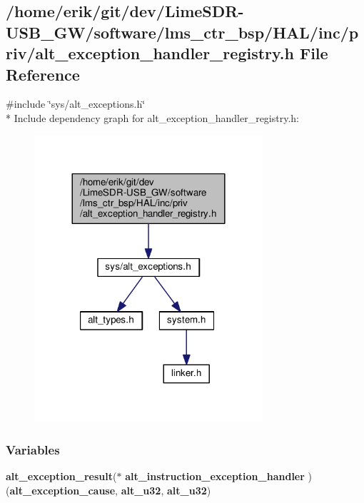 \subsection{/home/erik/git/dev/\+Lime\+S\+D\+R-\/\+U\+S\+B\+\_\+\+G\+W/software/lms\+\_\+ctr\+\_\+bsp/\+H\+A\+L/inc/priv/alt\+\_\+exception\+\_\+handler\+\_\+registry.h File Reference}
\label{alt__exception__handler__registry_8h}
{\ttfamily \#include \char`\"{}sys/alt\+\_\+exceptions.\+h\char`\"{}}\\*
Include dependency graph for alt\+\_\+exception\+\_\+handler\+\_\+registry.\+h\+:
\nopagebreak
\begin{figure}[H]
\begin{center}
\leavevmode
\includegraphics[width=240pt]{d8/d2b/alt__exception__handler__registry_8h__incl}
\end{center}
\end{figure}
\subsubsection*{Variables}
\begin{DoxyCompactItemize}
\item 
{\bf alt\+\_\+exception\+\_\+result}($\ast$ {\bf alt\+\_\+instruction\+\_\+exception\+\_\+handler} )({\bf alt\+\_\+exception\+\_\+cause}, {\bf alt\+\_\+u32}, {\bf alt\+\_\+u32})
\end{DoxyCompactItemize}


